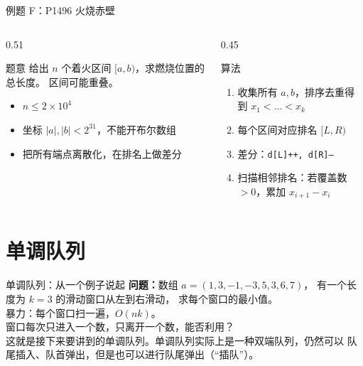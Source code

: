 \documentclass[aspectratio=169]{beamer}
\begin{document}
\begin{frame}{例题 F：P1496 火烧赤壁}
    \begin{columns}[T]
        \begin{column}{0.51\textwidth}
            \small
            \begin{block}{题意}
                \footnotesize
                给出 $n$ 个着火区间 $[a,b)$，求燃烧位置的总长度。
                区间可能重叠。
            \end{block}
            \begin{itemize}
                \item $n\le 2\times10^4$
                \item 坐标 $|a|,|b|<2^{31}$，不能开布尔数组
                \item 把所有端点离散化，在排名上做差分
            \end{itemize}
        \end{column}
        \begin{column}{0.45\textwidth}
            \begin{block}{算法}
                \footnotesize
                \begin{enumerate}
                    \item 收集所有 $a,b$，排序去重得到 $x_1<\dots<x_k$
                    \item 每个区间对应排名 $[L,R)$
                    \item 差分：\texttt{d[L]++, d[R]--}
                    \item 扫描相邻排名：若覆盖数 $>0$，累加 $x_{i+1}-x_i$
                \end{enumerate}
            \end{block}
        \end{column}
    \end{columns}
\end{frame}

\section{单调队列}

\begin{frame}{单调队列：从一个例子说起}
    \textbf{问题：}数组 $a=(1,3,-1,-3,5,3,6,7)$，
    有一个长度为 $k=3$ 的滑动窗口从左到右滑动，
    求每个窗口的最小值。\\
    \vspace{0.3em}
    暴力：每个窗口扫一遍，$O(nk)$。\\
    \vspace{0.3em}
    窗口每次只进入一个数，只离开一个数，能否利用？\\
    \vspace{1em}
    这就是接下来要讲到的单调队列。单调队列实际上是一种双端队列，仍然可以
    队尾插入、队首弹出，但是也可以进行队尾弹出（“插队”）。
\end{frame}
\end{document}
